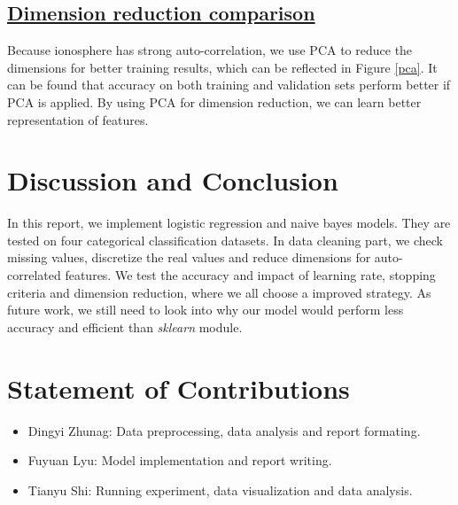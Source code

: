 \documentclass[11pt]{scrartcl}
\begin{document}
\subsection*{\underline{Dimension reduction comparison}}
Because ionosphere has strong auto-correlation, we use PCA to reduce the dimensions for better training results, which can be reflected in Figure \ref{pca}. It can be found that accuracy on both training and validation sets perform better if PCA is applied. By using PCA for dimension reduction, we can learn better representation of features.


\section{Discussion and Conclusion}

In this report, we implement logistic regression and naive bayes models. They are tested on four categorical classification datasets. In data cleaning part, we check missing values, discretize the real values and reduce dimensions for auto-correlated features. We test the accuracy and impact of learning rate, stopping criteria and dimension reduction, where we all choose a improved strategy. As future work, we still need to look into why our model would perform less accuracy and efficient than \textit{sklearn} module.

\section{Statement of Contributions}

\begin{itemize}
	\item Dingyi Zhunag: Data preprocessing, data analysis and report formating.
	\item Fuyuan Lyu: Model implementation and report writing.
	\item Tianyu Shi: Running experiment, data visualization and data analysis.
\end{itemize}



\end{document}
